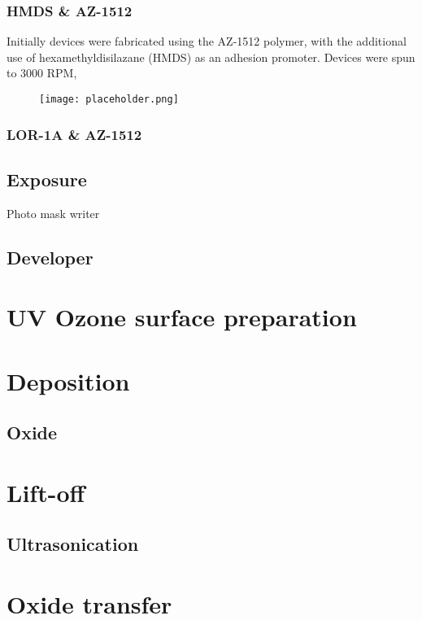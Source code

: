 \documentclass[../Matt_Gebert_Honours_Thesis.tex]{subfiles}
\begin{document}
	\subsubsection{HMDS \& AZ-1512}
		Initially devices were fabricated using the AZ-1512 polymer, with the additional use of hexamethyldisilazane (HMDS) as an adhesion promoter. Devices were spun to 3000 RPM, 
	
	\begin{figure}\label{fig:spin_curve_AZ-1512}
		\texttt{[image: placeholder.png]}
		\caption{}
	\end{figure}
	
	\subsubsection{LOR-1A \& AZ-1512}
	
	\subsection{Exposure}\label{sec:exposure}
		Photo mask writer
	
	\subsection{Developer}\label{sec:developer}
	
	\section{UV Ozone surface preparation}\label{sec:uv_ozone}
	
	\section{Deposition}\label{sec:deposition}
	
	\subsection{Oxide}
	
	\section{Lift-off}\label{}
	\subsection{Ultrasonication}
	
	\section{Oxide transfer}
\end{document}
